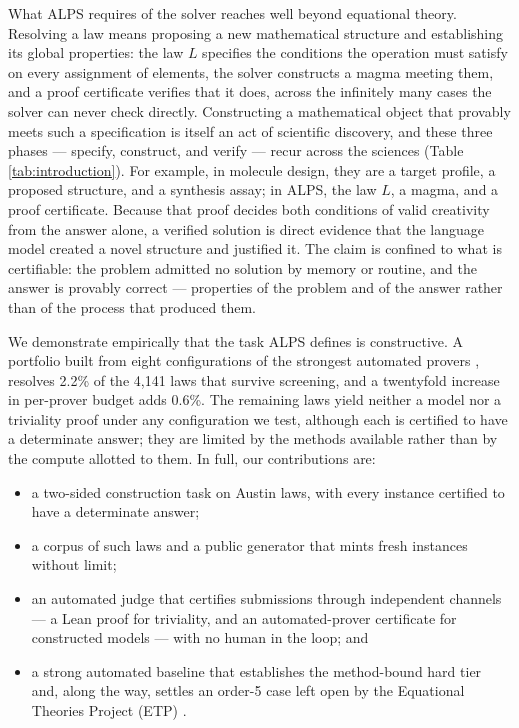 \documentclass[letterpaper]{article} %
\begin{document}




What ALPS requires of the solver reaches well beyond equational theory. Resolving a law means proposing a new mathematical structure and establishing its global properties: the law $L$ specifies the conditions the operation must satisfy on every assignment of elements, the solver constructs a magma meeting them, and a proof certificate verifies that it does, across the infinitely many cases the solver can never check directly. Constructing a mathematical object that provably meets such a specification is itself an act of scientific discovery, and these three phases --- specify, construct, and verify --- recur across the sciences (Table \ref{tab:introduction}). For example, in molecule design, they are a target profile, a proposed structure, and a synthesis assay; in ALPS, the law $L$, a magma, and a proof certificate. Because that proof decides both conditions of valid creativity from the answer alone, a verified solution is direct evidence that the language model created a novel structure and justified it. The claim is confined to what is certifiable: the problem admitted no solution by memory or routine, and the answer is provably correct --- properties of the problem and of the answer rather than of the process that produced them.



We demonstrate empirically that the task ALPS defines is constructive. A portfolio built from eight configurations of the strongest automated provers \citep{kovacs2013first, schulz2019faster, smallbone2021twee}, resolves 2.2\% of the 4,141 laws that survive screening, and a twentyfold increase in per-prover budget adds 0.6\%. The remaining laws yield neither a model nor a triviality proof under any configuration we test, although each is certified to have a determinate answer; they are limited by the methods available rather than by the compute allotted to them. In full, our contributions are:
\begin{itemize}
\item a two-sided construction task on Austin laws, with every instance certified to have a determinate answer;
\item a corpus of such laws and a public generator that mints fresh instances without limit;
\item an automated judge that certifies submissions through independent channels --- a Lean proof \citep{moura2021lean} for triviality, and an automated-prover certificate \citep{kovacs2013first} for constructed models --- with no human in the loop; and
\item a strong automated baseline that establishes the method-bound hard tier and, along the way, settles an order-5 case left open by the Equational Theories Project (ETP) \citep{bolan2025equational}.
\end{itemize}
\end{document}
